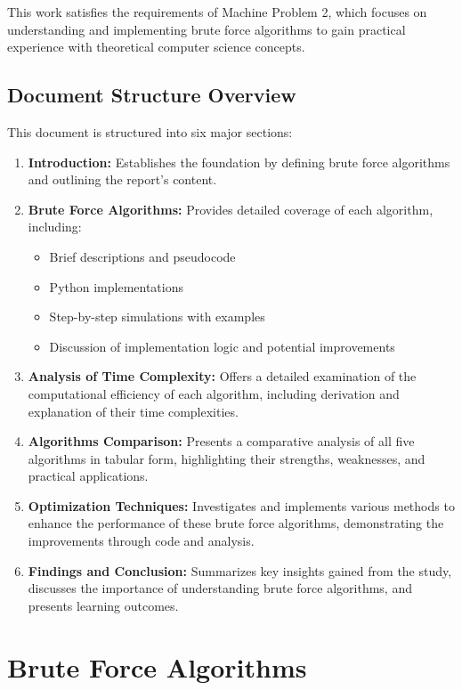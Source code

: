 \documentclass{article}
\begin{document}
This work satisfies the requirements of Machine Problem 2, which focuses on understanding and implementing brute force algorithms to gain practical experience with theoretical computer science concepts.

\subsection*{Document Structure Overview}
This document is structured into six major sections:
\begin{enumerate}
    \item \textbf{Introduction:} Establishes the foundation by defining brute force algorithms and outlining the report's content.
    \item \textbf{Brute Force Algorithms:} Provides detailed coverage of each algorithm, including:
    \begin{itemize}
        \item Brief descriptions and pseudocode
        \item Python implementations
        \item Step-by-step simulations with examples
        \item Discussion of implementation logic and potential improvements
    \end{itemize}
    \item \textbf{Analysis of Time Complexity:} Offers a detailed examination of the computational efficiency of each algorithm, including derivation and explanation of their time complexities.
    \item \textbf{Algorithms Comparison:} Presents a comparative analysis of all five algorithms in tabular form, highlighting their strengths, weaknesses, and practical applications.
    \item \textbf{Optimization Techniques:} Investigates and implements various methods to enhance the performance of these brute force algorithms, demonstrating the improvements through code and analysis.
    \item \textbf{Findings and Conclusion:} Summarizes key insights gained from the study, discusses the importance of understanding brute force algorithms, and presents learning outcomes.
\end{enumerate}


\clearpage
\section{Brute Force Algorithms}
\end{document}
